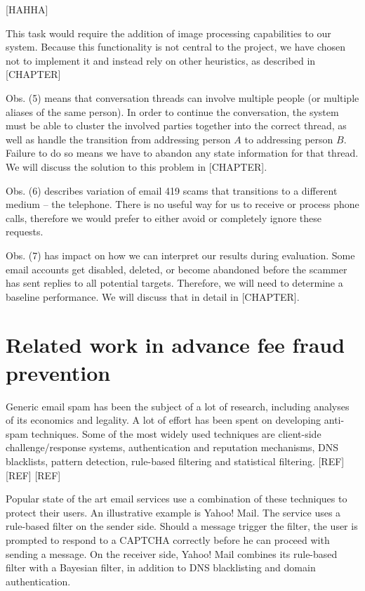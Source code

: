 [HAHHA]

This task would require the addition of image processing capabilities to our system. Because this functionality is not central to the project, we have chosen not to implement it and instead rely on other heuristics, as described in [CHAPTER]

Obs. (5) means that conversation threads can involve multiple people (or multiple aliases of the same person). In order to continue the conversation, the system must be able to cluster the involved parties together into the correct thread, as well as handle the transition from addressing person $A$ to addressing person $B$. Failure to do so means we have to abandon any state information for that thread. We will discuss the solution to this problem in [CHAPTER].

Obs. (6) describes variation of email 419 scams that transitions to a different medium -- the telephone. There is no useful way for us to receive or process phone calls, therefore we would prefer to either avoid or completely ignore these requests.

Obs. (7) has impact on how we can interpret our results during evaluation. Some email accounts get disabled, deleted, or become abandoned before the scammer has sent replies to all potential targets. Therefore, we will need to determine a baseline performance. We will discuss that in detail in [CHAPTER].

\section{Related work in advance fee fraud prevention}
Generic email spam has been the subject of a lot of research, including analyses of its economics and legality. A lot of effort has been spent on developing anti-spam techniques. Some of the most widely used techniques are client-side challenge/response systems, authentication and reputation mechanisms, DNS blacklists, pattern detection, rule-based filtering and statistical filtering. [REF] [REF] [REF]

Popular state of the art email services use a combination of these techniques to protect their users. An illustrative example is Yahoo! Mail. The service uses a rule-based filter on the sender side. Should a message trigger the filter, the user is prompted to respond to a CAPTCHA correctly before he can proceed with sending a message. On the receiver side, Yahoo! Mail combines its rule-based filter with a Bayesian filter, in addition to DNS blacklisting and domain authentication. 

